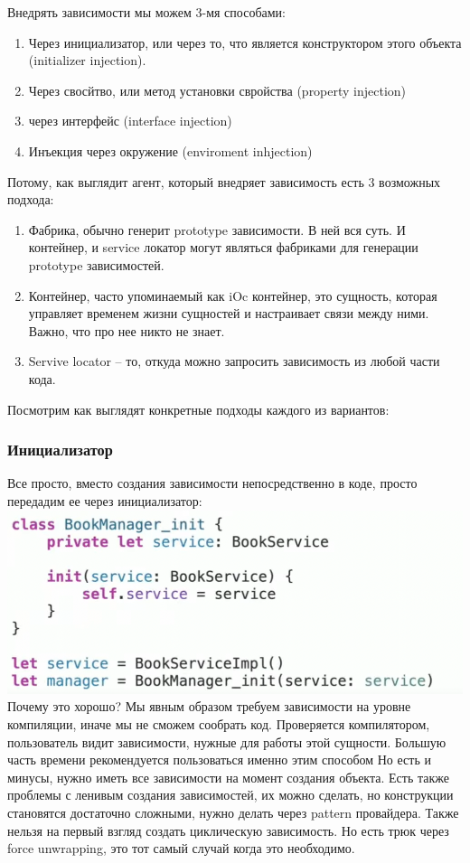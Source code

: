 \documentclass{article}
\begin{document}
    Внедрять зависимости мы можем 3-мя способами: 
    \begin{enumerate}
        \item Через инициализатор, или через то, что является конструктором этого объекта (initializer injection). 
        \item Через свосйтво, или метод установки свройства (property injection)
        \item через интерфейс (interface injection)
        \item Инъекция через окружение (enviroment inhjection)
    \end{enumerate}
    Потому, как выглядит агент, который внедряет зависимость есть 3 возможных подхода: 
        \begin{enumerate}
        \item Фабрика, обычно генерит prototype зависимости. В ней вся суть. И контейнер, и service локатор могут являться фабриками для генерации prototype зависимостей. 
        \item  Контейнер, часто упоминаемый как iOc контейнер, это сущность, которая управляет временем жизни сущностей и настраивает связи между ними. Важно, что про нее никто не знает. 
        \item Servive locator -- то, откуда можно запросить зависимость из любой части кода. 
    \end{enumerate}
    Посмотрим как выглядят конкретные подходы каждого из вариантов: 
    \subsubsection{Инициализатор}
    Все просто, вместо создания зависимости непосредственно в коде, просто передадим ее через инициализатор: 
    \newline
    \includegraphics[scale = 0.5]{pic/Снимок экрана 2023-07-31 в 01.06.33.png}
    \newline
     Почему это хорошо? Мы явным образом требуем зависимости на уровне компиляции, иначе мы не сможем сообрать код. Проверяется компилятором, пользователь видит зависимости, нужные для работы этой сущности. Большую часть времени рекомендуется пользоваться именно этим способом
    \newline
    Но есть и минусы, нужно иметь все зависимости на момент создания объекта. Есть также проблемы с ленивым создания зависимостей, их можно сделать, но конструкции становятся достаточно сложными, нужно делать через pattern провайдера. Также нельзя на первый взгляд создать циклическую зависимость. Но есть трюк через force unwrapping, это тот самый случай  когда это необходимо.
\end{document}
